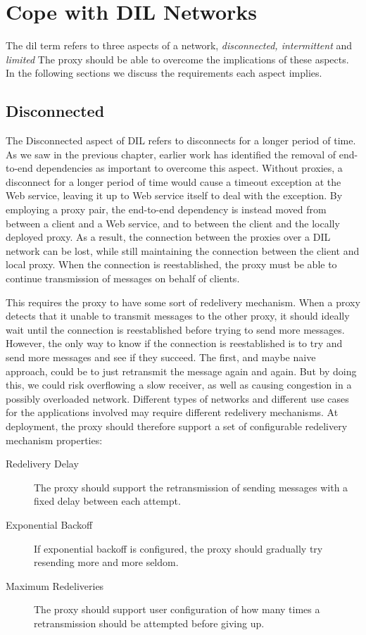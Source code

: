 \section{Cope with DIL Networks}

The \gls{dil} term refers to three aspects of a network, \textit{disconnected,
intermittent} and \textit{limited} The proxy should be able to
overcome the implications of these aspects. In the following sections we discuss
the requirements each aspect implies.

\subsection{Disconnected}

The Disconnected aspect of DIL refers to disconnects for a longer period of
time. As we saw in the previous chapter, earlier work has identified the removal
of end-to-end dependencies as important to overcome this aspect. Without
proxies, a disconnect for a longer period of time would cause a timeout
exception at the Web service, leaving it up to Web service itself to deal with
the exception. By employing a proxy pair, the end-to-end dependency is instead
moved from between a client and a Web service, and to between the client and the
locally deployed proxy. As a result, the connection between the proxies over a
DIL network can be lost, while still maintaining the connection between the
client and local proxy. When the connection is reestablished, the proxy must be
able to continue transmission of messages on behalf of clients.

This requires the proxy to have some sort of redelivery mechanism. When a proxy
detects that it unable to transmit messages to the other proxy, it should
ideally wait until the connection is reestablished before trying to send more
messages. However, the only way to know if the connection is reestablished is to
try and send more messages and see if they succeed. The first, and maybe naive
approach, could be to just retransmit the message again and again. But by doing
this, we could risk overflowing a slow receiver, as well as causing congestion
in a possibly overloaded network. Different types of networks and different use
cases for the applications involved may require different redelivery mechanisms.
At deployment, the proxy should therefore support a  set of configurable
redelivery mechanism properties:

\begin{description}

    \item[Redelivery Delay] The proxy should support the retransmission of
    sending messages with a fixed delay between each attempt.

    \item[Exponential Backoff] If exponential backoff is configured, the proxy
    should gradually try resending more and more seldom.

    \item[Maximum Redeliveries] The proxy should support user configuration of
    how many times a retransmission should be attempted before giving up.

\end{description}


